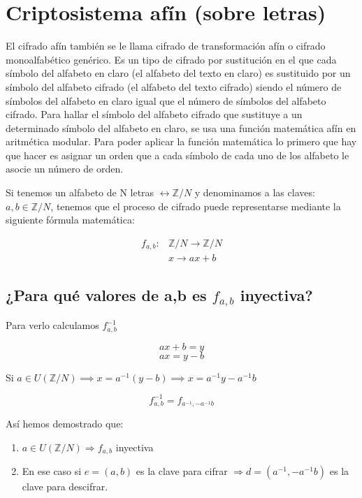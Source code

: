 		\section{Criptosistema afín (sobre letras)}

			\begin{defn}
			El cifrado afín también se le llama cifrado de transformación afín o cifrado monoalfabético genérico. Es un tipo de cifrado por sustitución en el que cada símbolo del alfabeto en claro (el alfabeto del texto en claro) es sustituido por un símbolo del alfabeto cifrado (el alfabeto del texto cifrado) siendo el número de símbolos del alfabeto en claro igual que el número de símbolos del alfabeto cifrado. Para hallar el símbolo del alfabeto cifrado que sustituye a un determinado símbolo del alfabeto en claro, se usa una función matemática afín en aritmética modular. Para poder aplicar la función matemática lo primero que hay que hacer es asignar un orden que a cada símbolo de cada uno de los alfabeto le asocie un número de orden.
			\end{defn}

			Si tenemos un alfabeto de N letras $\leftrightarrow \mathbb{Z}/N$ y denominamos a las claves: $a,b \in \mathbb{Z}/N$, tenemos que el proceso de cifrado puede representarse mediante la siguiente fórmula matemática:

			\begin{align*}
				f_{a,b} :&  \mathbb{Z}/N\to \mathbb{Z}/N\\
				& x \rightarrow ax + b
			\end{align*}

			\subsection{¿Para qué valores de a,b es $f_{a,b}$ inyectiva?}

			Para verlo calculamos $f^{-1}_{a,b}$

			$$ax+b = y$$
			$$ax = y - b$$

			Si $a \in U(\mathbb{Z}/N)
			\implies
			x = a^{-1} (y-b) \implies
			x = a^{-1}y - a^{-1}b$


			$$f^{-1}_{a,b} = f_{a^{-1},-a^{-1}b}$$

			Así hemos demostrado que:

			\begin{enumerate}
				\item $a \in U(\mathbb{Z}/N) \Rightarrow f_{a,b}$ inyectiva
				\item En ese caso si $e = (a,b)$ es la clave para cifrar $\Rightarrow d = (a^{-1},-a^{-1}b)$ es la clave para descifrar.
			\end{enumerate}

